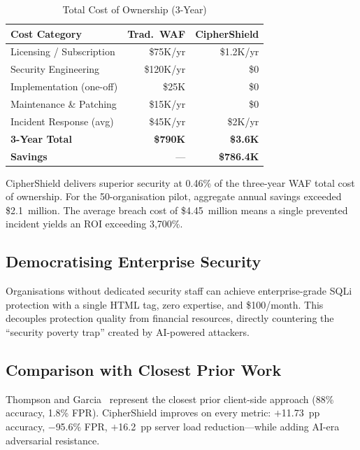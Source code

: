 \documentclass[10pt,twocolumn]{article}
\begin{document}
\begin{table}[H]
\centering
\caption{Total Cost of Ownership (3-Year)}
\label{tab:tco}
\small
\setlength{\tabcolsep}{3pt}
\begin{tabular}{@{}lrr@{}}
\toprule
\textbf{Cost Category} & \textbf{Trad.\ WAF} & \textbf{CipherShield} \\
\midrule
Licensing / Subscription & \$75K/yr   & \$1.2K/yr \\
Security Engineering     & \$120K/yr  & \$0       \\
Implementation (one-off) & \$25K      & \$0       \\
Maintenance \& Patching  & \$15K/yr   & \$0       \\
Incident Response (avg)  & \$45K/yr   & \$2K/yr   \\
\midrule
\textbf{3-Year Total}    & \textbf{\$790K} & \textbf{\$3.6K} \\
\textbf{Savings}         & ---        & \textbf{\$786.4K} \\
\bottomrule
\end{tabular}
\end{table}

CipherShield delivers superior security at 0.46\% of the three-year WAF
total cost of ownership. For the 50-organisation pilot, aggregate annual
savings exceeded \$2.1~million. The average breach cost of \$4.45~million
means a single prevented incident yields an ROI exceeding 3,700\%.

\subsection{Democratising Enterprise Security}

Organisations without dedicated security staff can achieve enterprise-grade
SQLi protection with a single HTML tag, zero expertise, and \$100/month.
This decouples protection quality from financial resources, directly
countering the ``security poverty trap'' created by AI-powered attackers.

\subsection{Comparison with Closest Prior Work}

Thompson and Garcia~\cite{thompson2024} represent the closest prior
client-side approach (88\% accuracy, 1.8\% FPR). CipherShield improves
on every metric: $+$11.73~pp accuracy, $-$95.6\% FPR, $+$16.2~pp server
load reduction---while adding AI-era adversarial resistance.
\end{document}
